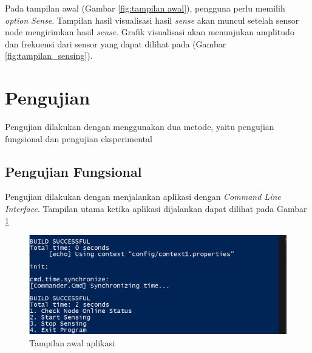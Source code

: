 Pada tampilan awal (Gambar \ref{fig:tampilan awal}), pengguna perlu memilih \textit{option} \textit{Sense}. Tampilan hasil visualisasi hasil \textit{sense} akan muncul setelah sensor node mengirimkan hasil \textit{sense}. Grafik visualisasi akan menunjukan amplitudo dan frekuensi dari sensor yang dapat dilihat pada (Gambar \ref{fig:tampilan_sensing}).

\section{Pengujian}
Pengujian dilakukan dengan menggunakan dua metode, yaitu pengujian fungsional dan pengujian eksperimental

\subsection{Pengujian Fungsional}
Pengujian dilakukan dengan menjalankan aplikasi dengan \textit{Command Line Interface}. Tampilan utama ketika aplikasi dijalankan dapat dilihat pada Gambar \ref{fig:tampilan awal2}
\begin{figure}[H] 
	\centering  
	\includegraphics[scale=1]{Gambar/Hasil Sensing/visualisasi.PNG}
	\caption[Tampilan awal aplikasi]{Tampilan awal aplikasi}
	\label{fig:tampilan awal2} 
\end{figure}

